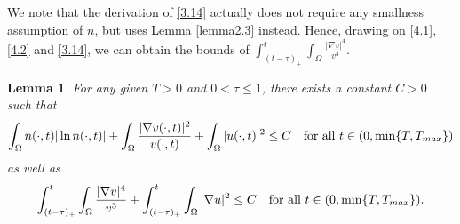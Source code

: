\documentclass[12pt]{article}
\theoremstyle{plain}
\newtheorem{lemma}{Lemma}[section]
\theoremstyle{definition}
\numberwithin{equation}{section}
\begin{document}
We note that the derivation of \eqref{3.14} actually does not require any smallness assumption of $n$, but uses Lemma \ref{lemma2.3} instead.
Hence, drawing on  \eqref{4.1}, \eqref{4.2} and \eqref{3.14}, we can obtain the bounds of  $ \int^{t}_{(t-\tau)_+} \int_\Omega  \frac{|\nabla v|^4}{v^3}$.

\begin{lemma}\label{lemma4.3} For any given $T>0$ and $0<\tau\leq 1$, there exists a constant $C>0$  such that
\begin{equation}\label{4.4}
\begin{split}
\int_\Omega n(\cdot,t)|\ln n(\cdot,t)|+\int_\Omega  \frac{|\nabla v(\cdot,t)|^2}{v(\cdot,t)}+\int_\Omega |u(\cdot,t)|^2\leq C
\quad \hbox{for all}\,  \,t\in (0,\min\{T,T_{max}\})
\end{split}
\end{equation}
as well as
\begin{equation}\label{4.5}
\begin{split}
 \int^{t}_{(t-\tau)_+} \int_\Omega  \frac{|\nabla v|^4}{v^3}+\int^{t}_{(t-\tau)_+} \int_\Omega |\nabla u|^2 \leq C
\quad \hbox{for all}\,  \,t\in (0,\min\{T,T_{max}\}).
\end{split}
\end{equation}
\end{lemma}
\end{document}

